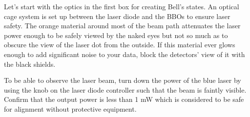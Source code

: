 \documentclass{../lab}
\begin{document}


Let's start with the optics in the first box for creating Bell's states. An optical cage system is set up between the laser diode and the BBOs to ensure laser safety. The orange material around most of the beam path attenuates the laser power enough to be safely viewed by the naked eyes but not so much as to obscure the view of the laser dot from the outside. If this material ever glows enough to add significant noise to your data, block the detectors' view of it with the black shields.

To be able to observe the laser beam, turn down the power of the blue laser by using the knob on the laser diode controller such that the beam is faintly visible. Confirm that the output power is less than 1 mW which is considered to be safe for alignment without protective equipment.
\end{document}
